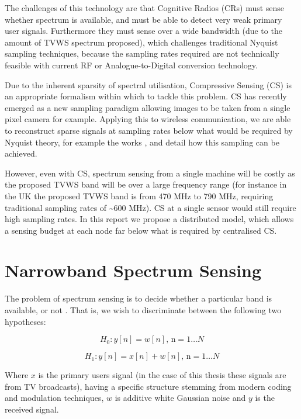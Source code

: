The challenges of this technology are that Cognitive Radios (CRs) must sense whether spectrum is available, and must be able to detect very weak primary user signals. Furthermore they must sense over a wide bandwidth (due to the amount of TVWS spectrum proposed), which challenges traditional Nyquist sampling techniques, because the sampling rates required are not technically feasible with current RF or Analogue-to-Digital conversion technology.

Due to the inherent sparsity of spectral utilisation, Compressive Sensing (CS) \cite{Candes2006} is an appropriate formalism within which to tackle this problem. CS has recently emerged as a new sampling paradigm allowing images to be taken from a single pixel camera for example. Applying this to wireless communication, we are able to reconstruct sparse signals at sampling rates below what would be required by Nyquist theory, for example the works \cite{mishali2010theory}, and \cite{tropp2010beyond} detail how this sampling can be achieved. 

However, even with CS, spectrum sensing from a single machine will be costly as the proposed TVWS band will be over a large frequency range (for instance in the UK the proposed TVWS band is from 470 MHz to 790 MHz, requiring traditional sampling rates of \textasciitilde 600 MHz). CS at a single sensor would still require high sampling rates. In this report we propose a distributed model, which allows a sensing budget at each node far below what is required by centralised CS.

\section{Narrowband Spectrum Sensing}

The problem of spectrum sensing is to decide whether a particular band is available, or not \cite{Yucek2009}. That is, we wish to discriminate between the following two hypotheses:

\begin{equation}
H_{0}: y\left[n\right] = w\left[n\right] \text{, n} =  1 \ldots N 
\end{equation}
\label{h1}

\begin{equation}
H_{1}: y\left[n \right] = x\left[n\right] + w\left[n\right] \text{, n} =  1 \ldots N 
\end{equation}
\label{h2}

Where \(x\) is the primary users signal (in the case of this thesis these signals are from TV broadcasts), having a specific structure stemming from modern coding and modulation techniques, \(w\) is additive white Gaussian noise and \(y\) is the received signal.

